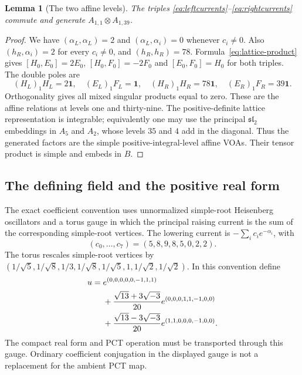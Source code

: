 \documentclass[11pt,a4paper]{article}
\newtheorem{lemma}[theorem]{Lemma}
\theoremstyle{definition}
\newcommand{\one}{\mathbf1}
\begin{document}
\begin{lemma}[The two affine levels]\label{lem:levels}
The triples \eqref{eq:leftcurrents}--\eqref{eq:rightcurrents} commute
and generate $A_{1,1}\otimes A_{1,39}$.
\end{lemma}
\begin{proof}
We have $(\alpha_L,\alpha_L)=2$ and
$(\alpha_L,\alpha_i)=0$ whenever $c_i\ne0$.
Also $(h_R,\alpha_i)=2$ for every $c_i\ne0$, and
$(h_R,h_R)=78$. Formula~\eqref{eq:lattice-product} gives
$[H_0,E_0]=2E_0$, $[H_0,F_0]=-2F_0$ and $[E_0,F_0]=H_0$
for both triples. The double poles are
\[
 (H_L)_1H_L=2\one,\quad (E_L)_1F_L=\one,\quad
 (H_R)_1H_R=78\one,\quad (E_R)_1F_R=39\one.
\]
Orthogonality gives all mixed singular products equal to zero.
These are the affine relations at levels one and thirty-nine.
The positive-definite lattice representation is integrable; equivalently
one may use the principal $\mathfrak{sl}_2$ embeddings in $A_5$ and
$A_2$, whose levels $35$ and $4$ add in the diagonal. Thus the
generated factors are the simple positive-integral-level affine VOAs.
Their tensor product is simple and embeds in $B$.
\end{proof}

\subsection{The defining field and the positive real form}
The exact coefficient convention uses unnormalized simple-root
Heisenberg oscillators and a torus gauge in which the principal raising
current is the sum of the corresponding simple-root vertices. The
lowering current is \(-\sum_i c_i e^{-\alpha_i}\), with
\[
 (c_0,\ldots,c_7)=(5,8,9,8,5,0,2,2).
\]
The torus rescales simple-root vertices by
\( (1/\sqrt5,1/\sqrt8,1/3,1/\sqrt8,1/\sqrt5,1,1/\sqrt2,1/\sqrt2)\).
In this convention define
\begin{align}
 u={}&e^{(0,0,0,0,0,-1,1,1)}\notag\\
 &+\frac{\sqrt{13}+3\sqrt{-3}}{20}
                   e^{(0,0,0,1,1,-1,0,0)}\notag\\
 &+\frac{\sqrt{13}-3\sqrt{-3}}{20}
                   e^{(1,1,0,0,0,-1,0,0)}.\label{eq:u}
\end{align}
The compact real form and PCT operation must be transported through
this gauge. Ordinary coefficient conjugation in the displayed gauge
is not a replacement for the ambient PCT map.
\end{document}
